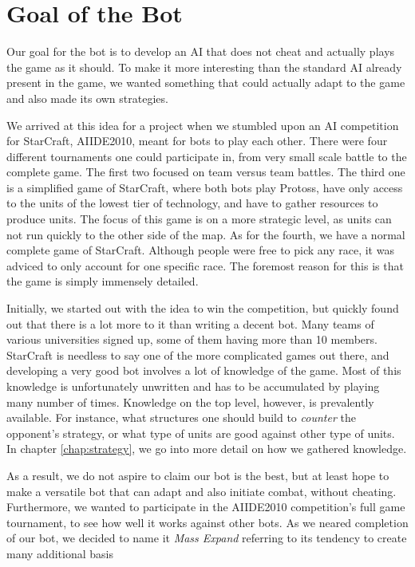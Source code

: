 \section{Goal of the Bot}
Our goal for the bot is to develop an AI that does not cheat and actually plays the game as it should. To make it more interesting than the standard AI already present in the game, we wanted something that could actually adapt to the game and also made its own strategies.

We arrived at this idea for a project when we stumbled upon an AI competition for StarCraft, AIIDE2010, meant for bots to play each other. There were four different tournaments one could participate in, from very small scale battle to the complete game. The first two focused on team versus team battles. The third one is a simplified game of StarCraft, where both bots play Protoss, have only access to the units of the lowest tier of technology, and have to gather resources to produce units. The focus of this game is on a more strategic level, as units can not run quickly to the other side of the map. As for the fourth, we have a normal complete game of StarCraft. Although people were free to pick any race, it was adviced to only account for one specific race. The foremost reason for this is that the game is simply immensely detailed.

Initially, we started out with the idea to win the competition, but quickly found out that there is a lot more to it than writing a decent bot. Many teams of various universities signed up, some of them having more than 10 members. StarCraft is needless to say one of the more complicated games out there, and developing a very good bot involves a lot of knowledge of the game. Most of this knowledge is unfortunately unwritten and has to be accumulated by playing many number of times. Knowledge on the top level, however, is prevalently available. For instance, what structures one should build to \emph{counter} the opponent's strategy, or what type of units are good against other type of units. In chapter \ref{chap:strategy}, we go into more detail on how we gathered knowledge.

As a result, we do not aspire to claim our bot is the best, but at least hope to make a versatile bot that can adapt and also initiate combat, without cheating. Furthermore, we wanted to participate in the AIIDE2010 competition's full game tournament, to see how well it works against other bots. As we neared completion of our bot, we decided to name it \emph{Mass Expand} referring to its tendency to create many additional basis


